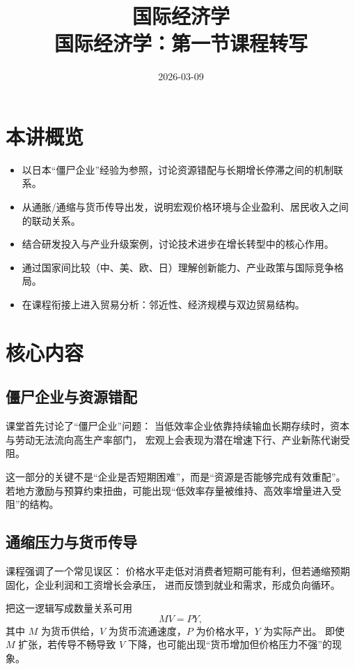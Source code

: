 \documentclass[UTF8,11pt,a4paper]{ctexart}
\title{ 国际经济学 \\ \large 国际经济学：第一节课程转写 }
\author{}
\date{2026-03-09}
\begin{document}
\maketitle

\section{本讲概览}

\begin{itemize}
  \item 以日本“僵尸企业”经验为参照，讨论资源错配与长期增长停滞之间的机制联系。
  \item 从通胀/通缩与货币传导出发，说明宏观价格环境与企业盈利、居民收入之间的联动关系。
  \item 结合研发投入与产业升级案例，讨论技术进步在增长转型中的核心作用。
  \item 通过国家间比较（中、美、欧、日）理解创新能力、产业政策与国际竞争格局。
  \item 在课程衔接上进入贸易分析：邻近性、经济规模与双边贸易结构。
\end{itemize}

\section{核心内容}

\subsection{僵尸企业与资源错配}

课堂首先讨论了“僵尸企业”问题：
当低效率企业依靠持续输血长期存续时，资本与劳动无法流向高生产率部门，
宏观上会表现为潜在增速下行、产业新陈代谢受阻。

这一部分的关键不是“企业是否短期困难”，而是“资源是否能够完成有效重配”。
若地方激励与预算约束扭曲，可能出现“低效率存量被维持、高效率增量进入受阻”的结构。

\subsection{通缩压力与货币传导}

课程强调了一个常见误区：
价格水平走低对消费者短期可能有利，但若通缩预期固化，企业利润和工资增长会承压，
进而反馈到就业和需求，形成负向循环。

把这一逻辑写成数量关系可用
\begin{equation}
  M V = P Y,
\end{equation}
其中 $M$ 为货币供给，$V$ 为货币流通速度，$P$ 为价格水平，$Y$ 为实际产出。
即使 $M$ 扩张，若传导不畅导致 $V$ 下降，也可能出现“货币增加但价格压力不强”的现象。
\end{document}
